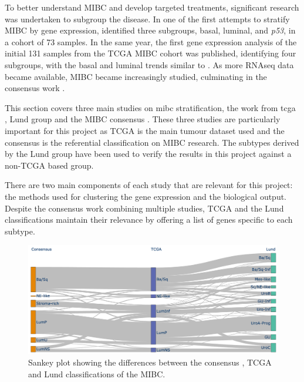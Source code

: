 
To better understand \gls{MIBC} and develop targeted treatments, significant research was undertaken to subgroup the disease. In one of the first attempts to stratify MIBC by gene expression, \citet{Choi2014-ed} identified three subgroups, basal, luminal, and \textit{p53}, in a cohort of 73 samples. In the same year, the first gene expression analysis of the initial 131 samples from the \gls{TCGA} MIBC cohort was published, identifying four subgroups, with the basal and luminal trends similar to \citet{Choi2014-ed}. As more RNAseq data became available, MIBC became increasingly studied, culminating in the consensus work \citep{Kamoun2020-tj}.


This section covers three main studies on \acrshort{mibc} stratification, the work from \acrshort{tcga} \citep{Robertson2017-mg}, Lund group \citep{Marzouka2018-ge} and the MIBC consensus \citep{Kamoun2020-tj}. These three studies are particularly important for this project as TCGA is the main tumour dataset used and the consensus is the referential classification on MIBC research. The subtypes derived by the Lund group have been used to verify the results in this project against a non-TCGA based group.

There are two main components of each study that are relevant for this project: the methods used for clustering the gene expression and the biological output. Despite the consensus work combining multiple studies, TCGA and the Lund classifications maintain their relevance by offering a list of genes specific to each subtype. 

\begin{figure}[!htb]   
\centering
\includegraphics[width=1.0\textwidth,height=1.0\textheight,keepaspectratio]{Sections/Lit_review/Resources/classifier_differences.png}
  \caption[Comparison between existing MIBC classifications]{Sankey plot showing the differences between the consensus \citep{Kamoun2020-tj}, TCGA \citep{Robertson2017-mg} and Lund \citep{Marzouka2018-ge} classifications of the MIBC.}
\label{fig:lit:classifier_comp}
\end{figure}

